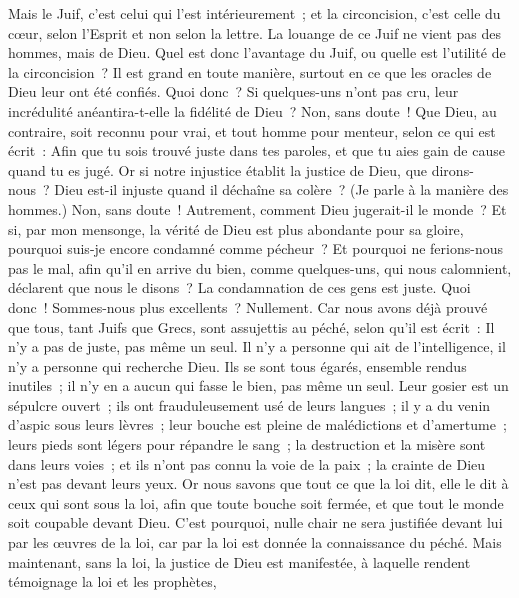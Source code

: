 \begin{multicols}{2}
Mais le Juif, c'est celui qui l'est intérieurement~; et la circoncision, c'est celle du cœur, selon l'Esprit et non selon la lettre. La louange de ce Juif ne vient pas des hommes, mais de Dieu.
\VerseOne{}Quel est donc l'avantage du Juif, ou quelle est l'utilité de la circoncision~?
Il est grand en toute manière, surtout en ce que les oracles de Dieu leur ont été confiés.
Quoi donc~? Si quelques-uns n'ont pas cru, leur incrédulité anéantira-t-elle la fidélité de Dieu~?
Non, sans doute~! Que Dieu, au contraire, soit reconnu pour vrai, et tout homme pour menteur, selon ce qui est écrit~: Afin que tu sois trouvé juste dans tes paroles, et que tu aies gain de cause quand tu es jugé.
Or si notre injustice établit la justice de Dieu, que dirons-nous~? Dieu est-il injuste quand il déchaîne sa colère~? (Je parle à la manière des hommes.)
Non, sans doute~! Autrement, comment Dieu jugerait-il le monde~?
Et si, par mon mensonge, la vérité de Dieu est plus abondante pour sa gloire, pourquoi suis-je encore condamné comme pécheur~?
Et pourquoi ne ferions-nous pas le mal, afin qu'il en arrive du bien, comme quelques-uns, qui nous calomnient, déclarent que nous le disons~? La condamnation de ces gens est juste.
Quoi donc~! Sommes-nous plus excellents~? Nullement. Car nous avons déjà prouvé que tous, tant Juifs que Grecs, sont assujettis au péché,
selon qu'il est écrit~: Il n'y a pas de juste, pas même un seul.
Il n'y a personne qui ait de l'intelligence, il n'y a personne qui recherche Dieu.
Ils se sont tous égarés, ensemble rendus inutiles~; il n'y en a aucun qui fasse le bien, pas même un seul.
Leur gosier est un sépulcre ouvert~; ils ont frauduleusement usé de leurs langues~; il y a du venin d'aspic sous leurs lèvres~;
leur bouche est pleine de malédictions et d'amertume~;
leurs pieds sont légers pour répandre le sang~;
la destruction et la misère sont dans leurs voies~;
et ils n'ont pas connu la voie de la paix~;
la crainte de Dieu n'est pas devant leurs yeux.
Or nous savons que tout ce que la loi dit, elle le dit à ceux qui sont sous la loi, afin que toute bouche soit fermée, et que tout le monde soit coupable devant Dieu.
C'est pourquoi, nulle chair ne sera justifiée devant lui par les œuvres de la loi, car par la loi est donnée la connaissance du péché.
Mais maintenant, sans la loi, la justice de Dieu est manifestée, à laquelle rendent témoignage la loi et les prophètes,

\end{multicols}
